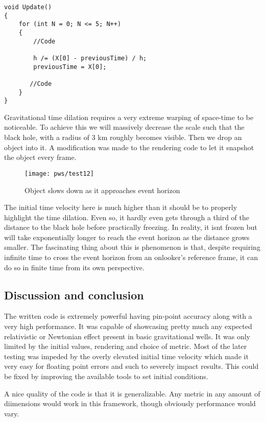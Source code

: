 \documentclass{article}
\begin{document}
\begin{verbatim}
void Update()
{
    for (int N = 0; N <= 5; N++)
    {
        //Code

        h /= (X[0] - previousTime) / h;
        previousTime = X[0];

       //Code
    }
}
\end{verbatim}

Gravitational time dilation requires a very extreme warping of space-time to be noticeable. To achieve this we will massively decrease the scale such that the black hole, with a radius of 3 km roughly becomes visible. Then we drop an object into it. A modification was made to the rendering code to let it snapshot the object every frame.

\begin{figure}[h!]
  \centering
  \texttt{[image: pws/test12]}
  \caption{Object slows down as it approaches event horizon}
  \label{fig:test4}
\end{figure}

The initial time velocity here is much higher than it should be to properly highlight the time dilation. Even so, it hardly even gets through a third of the distance to the black hole before practically freezing. In reality, it isnt frozen but will take exponentially longer to reach the event horizon as the distance grows smaller. The fascinating thing about this is phenomenon is that, despite requiring infinite time to cross the event horizon from an onlooker's reference frame, it can do so in finite time from its own perspective.

\subsection{Discussion and conclusion}

The written code is extremely powerful having pin-point accuracy along with a very high performance. It was capable of showcasing pretty much any expected relativistic or Newtonian effect present in basic gravitational wells. It was only limited by the initial values, rendering and choice of metric. Most of the later testing was impeded by the overly elevated initial time velocity which made it very easy for floating point errors and such to severely impact results. This could be fixed by improving the available tools to set initial conditions. 

A nice quality of the code is that it is  generalizable. Any metric in any amount of diimensions would work in this framework, though obviously performance would vary. 
\end{document}
